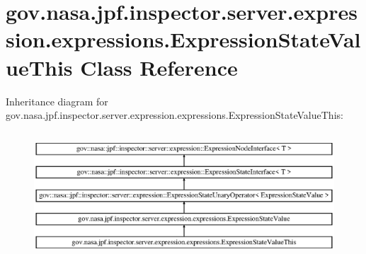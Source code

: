 \hypertarget{classgov_1_1nasa_1_1jpf_1_1inspector_1_1server_1_1expression_1_1expressions_1_1_expression_state_value_this}{}\section{gov.\+nasa.\+jpf.\+inspector.\+server.\+expression.\+expressions.\+Expression\+State\+Value\+This Class Reference}
\label{classgov_1_1nasa_1_1jpf_1_1inspector_1_1server_1_1expression_1_1expressions_1_1_expression_state_value_this}
Inheritance diagram for gov.\+nasa.\+jpf.\+inspector.\+server.\+expression.\+expressions.\+Expression\+State\+Value\+This\+:\begin{figure}[H]
\begin{center}
\leavevmode
\includegraphics[height=4.745763cm]{classgov_1_1nasa_1_1jpf_1_1inspector_1_1server_1_1expression_1_1expressions_1_1_expression_state_value_this}
\end{center}
\end{figure}

